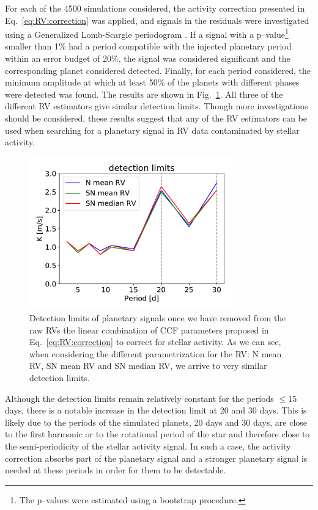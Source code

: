 \documentclass{aa}
\begin{document}
For each of the 4500 simulations considered, the activity correction presented in Eq.~\ref{eq:RV:correction} was applied, and signals in the residuals were investigated using a Generalized Lomb-Scargle periodogram \citep[][]{Lomb-1976a, Scargle-1982, Zechmeister-2009}. 
If a signal with a p--value\footnote{The p--values were estimated using a bootstrap procedure.} smaller than 1\% had a period compatible with the injected planetary period within an error budget of 20\%, the signal was considered significant and the corresponding planet considered detected. 
Finally, for each period considered, the minimum amplitude at which at least 50\% of the planets with different phases were detected was found. The results are shown in Fig.~\ref{fig:detection_limits}. 
All three of the different RV estimators give similar detection limits. Though more investigations should be considered, these results suggest that any of the RV estimators can be used when searching for a planetary signal in RV data contaminated by stellar activity.

\begin{figure}[!h]
\begin{center}
\includegraphics[height = 2.6in]{detection_limits.pdf} 
   \caption{Detection limits of planetary signals once we have removed from the raw RVs the linear combination of CCF parameters proposed in Eq.~\ref{eq:RV:correction} to correct for stellar activity. As we can see, when considering the different parametrization for the RV: N mean RV, SN mean RV and SN median RV, we arrive to very similar detection limits.}
   \label{fig:detection_limits}
\end{center}
\end{figure}

Although the detection limits remain relatively constant for the periods  $\leq$15 days, there is a notable increase in the detection limit at 20 and 30 days. 
This is likely due to the periods of the simulated planets, 20 days and 30 days, are close to the first harmonic or to the rotational period of the star \citep[36.7 days,][]{Dumusque-2012}
and therefore close to the semi-periodicity of the stellar activity signal. In such a case, the activity 
correction absorbs part of the planetary signal and a stronger planetary signal is needed at these periods in order for them to be detectable.
\end{document}
